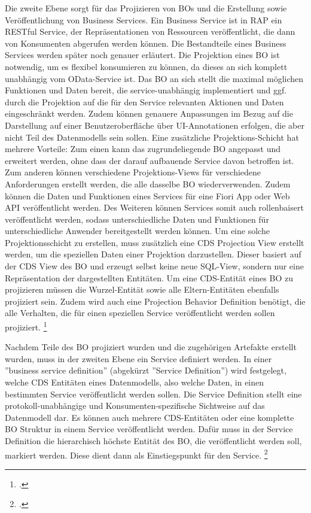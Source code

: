Die zweite Ebene sorgt für das Projizieren von BOs und die Erstellung sowie Veröffentlichung von Business Services. Ein Business Service ist in RAP ein RESTful Service, der Repräsentationen von Ressourcen veröffentlicht, die dann von Konsumenten abgerufen werden können. Die Bestandteile eines Business Services werden später noch genauer erläutert. Die Projektion eines BO ist notwendig, um es flexibel konsumieren zu können, da dieses an sich komplett unabhängig vom OData-Service ist. Das BO an sich stellt die maximal möglichen Funktionen und Daten bereit, die service-unabhängig implementiert und ggf. durch die Projektion auf die für den Service relevanten Aktionen und Daten eingeschränkt werden. Zudem können genauere Anpassungen \zB im Bezug auf die Darstellung auf einer Benutzeroberfläche über UI-Annotationen erfolgen, die aber nicht Teil des Datenmodells sein sollen. Eine zusätzliche Projektions-Schicht hat mehrere Vorteile: Zum einen kann das zugrundeliegende BO angepasst und erweitert werden, ohne dass der darauf aufbauende Service davon betroffen ist. Zum anderen können verschiedene Projektions-Views für verschiedene Anforderungen erstellt werden, die alle dasselbe BO wiederverwenden. Zudem können die Daten und Funktionen eines Services für eine Fiori App oder Web API veröffentlicht werden. Des Weiteren können Services somit auch rollenbaisert veröffentlicht werden, sodass unterschiedliche Daten und Funktionen für unterschiedliche Anwender bereitgestellt werden können. Um eine solche Projektionsschicht zu erstellen, muss zusätzlich eine CDS Projection View erstellt werden, um die speziellen Daten einer Projektion darzustellen. Dieser basiert auf der CDS View des BO und erzeugt selbst keine neue SQL-View, sondern nur eine Repräsentation der dargestellten Entitäten. Um eine CDS-Entität eines BO zu projizieren müssen die Wurzel-Entität sowie alle Eltern-Entitäten ebenfalls projiziert sein. Zudem wird auch eine Projection Behavior Definition benötigt, die alle Verhalten, die für einen speziellen Service veröffentlicht werden sollen projiziert. \footcite[Vgl.][]{sap_rap_2023}

Nachdem Teile des BO projiziert wurden und die zugehörigen Artefakte erstellt wurden, muss in der zweiten Ebene ein Service definiert werden. In einer ''business service definition'' (abgekürzt ''Service Definition'') wird festgelegt, welche CDS Entitäten eines Datenmodells, also welche Daten, in einen bestimmten Service veröffentlicht werden sollen. Die Service Definition stellt eine protokoll-unabhängige und Konsumenten-spezifische Sichtweise auf das Datenmodell dar. Es können auch mehrere CDS-Entitäten oder eine komplette BO Struktur in einem Service veröffentlicht werden. Dafür muss in der Service Definition die hierarchisch höchste Entität des BO, die veröffentlicht werden soll, markiert werden. Diese dient dann als Einstiegspunkt für den Service. \footcite[Vgl.][]{sap_rap_2023}


